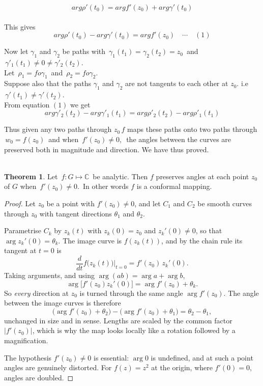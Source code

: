 \documentclass[11pt,a4paper]{article}
\theoremstyle{definition}
\newtheorem{thm}{Theorem}[section]
\begin{document}
$$\boxed{arg \rho'(t_0) = argf'(z_0) + arg \gamma'(t_0)}$$\\


This gives $$arg \rho'(t_0) - arg \gamma'(t_0) = arg f'(z_0)\quad \cdots\quad  (1)$$

Now let $\gamma_1$ and $\gamma_2$ be paths with  $\, \gamma_1 (t_1) = \gamma_2(t_2) = z_0\,$ and $\, \gamma'_1(t_1) \neq  0 \neq \gamma'_2(t_2)$.\\

Let $\, \rho_1 = fo\gamma_1\,$ and $\, \rho_2 = fo\gamma_2$.\\

Suppose also that the paths $\gamma_1$ and $\gamma_2$ are not tangents to each other at $z_0$. i.e $\, \gamma'(t_1) \neq \gamma'(t_2)$.\\

From equation $(1)$ we get  $$arg \gamma'_2(t_2) - arg\gamma'_1(t_1) = arg \rho'_2(t_2) - arg \rho'_1(t_1)$$

Thus given any two paths through $z_0\,f$ maps these paths onto two paths through $\, w_0 = f(z_0)\,$ and when $\, f'(z_0) \neq 0,\,$ the angles between the curves are preserved both in magnitude and direction. We have thus proved.\\\\




\begin{thm}
Let $\, f: G \longmapsto \mathbb{C}\,$ be analytic. Then $f$ preserves angles at each point $z_0$ of $G$ when $\, f'(z_0) \neq 0.\,$ In other words $f$ is a conformal mapping.
\end{thm}

\begin{proof}
Let $z_0$ be a point with $f'(z_0)\neq 0$, and let $C_1$ and $C_2$ be smooth
curves through $z_0$ with tangent directions $\theta_1$ and $\theta_2$.

Parametrise $C_k$ by $z_k(t)$ with $z_k(0)=z_0$ and $z_k'(0)\neq 0$, so that
$\arg z_k'(0)=\theta_k$. The image curve is $f(z_k(t))$, and by the chain rule
its tangent at $t=0$ is
$$\frac{d}{dt}f\big(z_k(t)\big)\Big|_{t=0}=f'(z_0)\,z_k'(0).$$
Taking arguments, and using $\arg(ab)=\arg a+\arg b$,
$$\arg\Big[f'(z_0)z_k'(0)\Big]=\arg f'(z_0)+\theta_k .$$
So \emph{every} direction at $z_0$ is turned through the same angle
$\arg f'(z_0)$. The angle between the image curves is therefore
$$\big(\arg f'(z_0)+\theta_2\big)-\big(\arg f'(z_0)+\theta_1\big)
=\theta_2-\theta_1 ,$$
unchanged in size and in sense. Lengths are scaled by the common factor
$\left|f'(z_0)\right|$, which is why the map looks locally like a rotation
followed by a magnification.

The hypothesis $f'(z_0)\neq 0$ is essential: $\arg 0$ is undefined, and at such
a point angles are genuinely distorted. For $f(z)=z^2$ at the origin, where
$f'(0)=0$, angles are doubled.
\end{proof}
\end{document}
